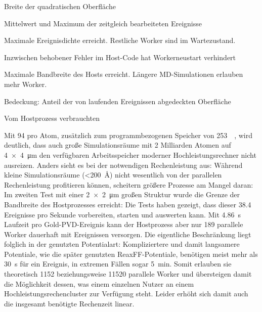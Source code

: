 \begin{table}
\begin{threeparttable}
    \begin{tablenotes}
    \item[2] Breite der quadratischen Oberfläche
    \item[a] Mittelwert und Maximum der zeitgleich bearbeiteten Ereignisse
    \item[b] Maximale Ereignisdichte erreicht.
      Restliche Worker sind im Wartezustand.
    \item[c] Inzwischen behobener Fehler im Host-Code hat Workerneustart verhindert
    \item[d] Maximale Bandbreite des Hosts erreicht.
      Längere MD-Simulationen erlauben mehr Worker.
    \item[e] Bedeckung: Anteil der von laufenden Ereignissen abgedeckten Oberfläche
    \item[f] Vom Hostprozess verbrauchten 
    \end{tablenotes}

\end{threeparttable}\end{table}

Mit \SI{94}{\byte} pro Atom, zusätzlich zum programmbezogenen Speicher von \SI{253}{\mebi\byte}, wird deutlich, dass auch große Simulationsräume mit 2 Milliarden Atomen auf \SI{4x4}{\micro\meter} den verfügbaren Arbeitsspeicher moderner Hochleistungsrechner nicht ausreizen.
Anders sieht es bei der notwendigen Rechenleistung aus:
Während kleine Simulationsräume (\SI{<200}{\angstrom}) nicht wesentlich von der parallelen Rechenleistung profitieren können, scheitern größere Prozesse am Mangel daran:
Im zweiten Test mit einer \SI{2x2}{\micro\meter} großen Struktur wurde die Grenze der Bandbreite des Hostprozesses erreicht:
Die Tests haben gezeigt, dass dieser \num{38.4} Ereignisse pro Sekunde vorbereiten, starten und auswerten kann.
Mit \SI{4.86}{\second} Laufzeit pro Gold-PVD-Ereignis kann der Hostprozess aber nur 189 parallele Worker dauerhaft mit Ereignissen versorgen.
Die eigentliche Beschränkung liegt folglich in der genutzten Potentialart:
Kompliziertere und damit langsamere Potentiale, wie die später genutzten ReaxFF-Potentiale, benötigen meist mehr als \SI{30}{\second} für ein Ereignis, in extremen Fällen sogar \SI{5}{\minute}.
Somit erlauben sie theoretisch \num{1152} beziehungsweise \num{11520} parallele Worker und übersteigen damit die Möglichkeit dessen, was einem einzelnen Nutzer an einem Hochleistungsrechencluster zur Verfügung steht.
Leider erhöht sich damit auch die insgesamt benötigte Rechenzeit linear.

